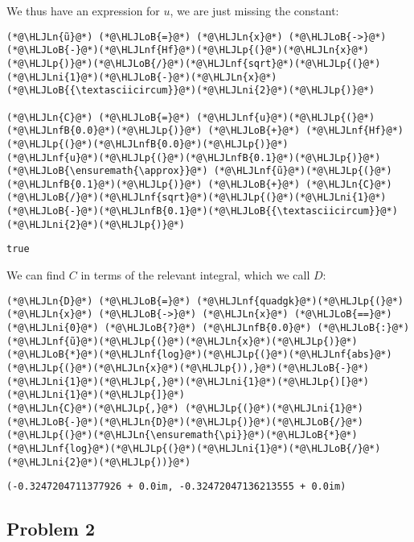 \documentclass[12pt,a4paper]{article}
\newcommand{\HLJLn}[1]{#1}
\newcommand{\HLJLnf}[1]{\textcolor[RGB]{66,102,213}{#1}}
\newcommand{\HLJLnfB}[1]{\textcolor[RGB]{59,151,46}{#1}}
\newcommand{\HLJLni}[1]{\textcolor[RGB]{59,151,46}{#1}}
\newcommand{\HLJLoB}[1]{\textcolor[RGB]{102,102,102}{\textbf{#1}}}
\newcommand{\HLJLp}[1]{#1}
\begin{document}
We thus have an expression for $u$, we are just missing the constant:


\begin{lstlisting}
(*@\HLJLn{ũ}@*) (*@\HLJLoB{=}@*) (*@\HLJLn{x}@*) (*@\HLJLoB{->}@*) (*@\HLJLoB{-}@*)(*@\HLJLnf{Hf}@*)(*@\HLJLp{(}@*)(*@\HLJLn{x}@*)(*@\HLJLp{)}@*)(*@\HLJLoB{/}@*)(*@\HLJLnf{sqrt}@*)(*@\HLJLp{(}@*)(*@\HLJLni{1}@*)(*@\HLJLoB{-}@*)(*@\HLJLn{x}@*)(*@\HLJLoB{{\textasciicircum}}@*)(*@\HLJLni{2}@*)(*@\HLJLp{)}@*)

(*@\HLJLn{C}@*) (*@\HLJLoB{=}@*) (*@\HLJLnf{u}@*)(*@\HLJLp{(}@*)(*@\HLJLnfB{0.0}@*)(*@\HLJLp{)}@*) (*@\HLJLoB{+}@*) (*@\HLJLnf{Hf}@*)(*@\HLJLp{(}@*)(*@\HLJLnfB{0.0}@*)(*@\HLJLp{)}@*)
(*@\HLJLnf{u}@*)(*@\HLJLp{(}@*)(*@\HLJLnfB{0.1}@*)(*@\HLJLp{)}@*) (*@\HLJLoB{\ensuremath{\approx}}@*) (*@\HLJLnf{ũ}@*)(*@\HLJLp{(}@*)(*@\HLJLnfB{0.1}@*)(*@\HLJLp{)}@*) (*@\HLJLoB{+}@*) (*@\HLJLn{C}@*)(*@\HLJLoB{/}@*)(*@\HLJLnf{sqrt}@*)(*@\HLJLp{(}@*)(*@\HLJLni{1}@*)(*@\HLJLoB{-}@*)(*@\HLJLnfB{0.1}@*)(*@\HLJLoB{{\textasciicircum}}@*)(*@\HLJLni{2}@*)(*@\HLJLp{)}@*)
\end{lstlisting}

\begin{lstlisting}
true
\end{lstlisting}


We can find $C$ in terms of the relevant integral, which we call $D$:


\begin{lstlisting}
(*@\HLJLn{D}@*) (*@\HLJLoB{=}@*) (*@\HLJLnf{quadgk}@*)(*@\HLJLp{(}@*)(*@\HLJLn{x}@*) (*@\HLJLoB{->}@*) (*@\HLJLn{x}@*) (*@\HLJLoB{==}@*) (*@\HLJLni{0}@*) (*@\HLJLoB{?}@*) (*@\HLJLnfB{0.0}@*) (*@\HLJLoB{:}@*) (*@\HLJLnf{ũ}@*)(*@\HLJLp{(}@*)(*@\HLJLn{x}@*)(*@\HLJLp{)}@*)(*@\HLJLoB{*}@*)(*@\HLJLnf{log}@*)(*@\HLJLp{(}@*)(*@\HLJLnf{abs}@*)(*@\HLJLp{(}@*)(*@\HLJLn{x}@*)(*@\HLJLp{)),}@*)(*@\HLJLoB{-}@*)(*@\HLJLni{1}@*)(*@\HLJLp{,}@*)(*@\HLJLni{1}@*)(*@\HLJLp{)[}@*)(*@\HLJLni{1}@*)(*@\HLJLp{]}@*)
(*@\HLJLn{C}@*)(*@\HLJLp{,}@*) (*@\HLJLp{(}@*)(*@\HLJLni{1}@*)(*@\HLJLoB{-}@*)(*@\HLJLn{D}@*)(*@\HLJLp{)}@*)(*@\HLJLoB{/}@*)(*@\HLJLp{(}@*)(*@\HLJLn{\ensuremath{\pi}}@*)(*@\HLJLoB{*}@*)(*@\HLJLnf{log}@*)(*@\HLJLp{(}@*)(*@\HLJLni{1}@*)(*@\HLJLoB{/}@*)(*@\HLJLni{2}@*)(*@\HLJLp{))}@*)
\end{lstlisting}

\begin{lstlisting}
(-0.3247204711377926 + 0.0im, -0.32472047136213555 + 0.0im)
\end{lstlisting}


\subsection{Problem 2}
\end{document}

